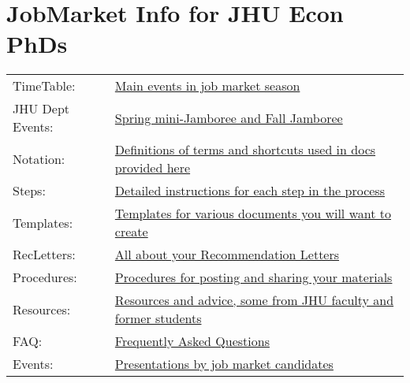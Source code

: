 \documentclass{\econtex}
\begin{document}
\medskip


\section*{JobMarket Info for JHU Econ PhDs}

\begin{tabular}{ll}
  TimeTable: & \href{\pageurl/TimeTable}{Main events in job market season} \\
  JHU Dept Events: & \href{\pageurl/Jamborees}{Spring mini-Jamboree and Fall Jamboree} \\
  Notation: & \href{\pageurl/Notation}{Definitions of terms and shortcuts used in docs provided here} \\
  Steps: & \href{\pageurl/Steps}{Detailed instructions for each step in the process} \\
  Templates: & \href{\bloburl/Templates}{Templates for various documents you will want to create} \\
  RecLetters: & \href{\pageurl/RecLetters}{All about your Recommendation Letters} \\
  Procedures: & \href{\bloburl/JobMarketProceduresHelp.md}{Procedures for posting and sharing your materials} \\
  Resources: & \href{\bloburl/Resources}{Resources and advice, some from JHU faculty and former students} \\
  FAQ: & \href{\pageurl/FAQ}{Frequently Asked Questions} \\
  Events: & \href{\bloburl/Jamborees}{Presentations by job market candidates}
\end{tabular}
\end{document}
